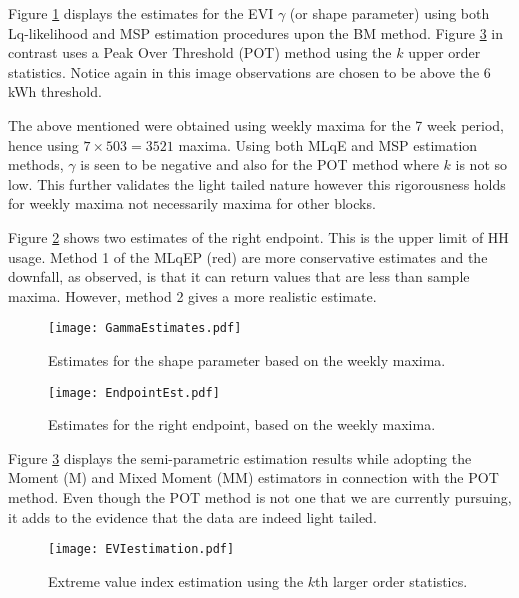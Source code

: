 Figure \ref{fig:gammaEst} displays the estimates for the EVI $\gamma$ (or shape parameter) using both Lq-likelihood and MSP estimation procedures upon the BM method. Figure \ref{fig:POTEst} in contrast uses a Peak Over Threshold (POT) method using the $k$ upper order statistics. Notice again in this image observations are chosen to be above the 6 kWh threshold.

The above mentioned were obtained using weekly maxima for the 7 week period, hence using $7 \times 503= 3521$ maxima. Using both MLqE and MSP estimation methods, $\gamma$ is seen to be negative and also for the POT method where $k$ is not so low. This further validates the light tailed nature however this rigorousness holds for weekly maxima not necessarily maxima for other blocks. 

Figure \ref{fig:EndPointEst}  shows two estimates of the right endpoint. This is the upper limit of HH usage. Method 1 of the MLqEP (red) are more conservative estimates and the downfall, as observed, is that it can return values that are less than sample maxima. However, method 2 gives a more realistic estimate.

\begin{figure}
\begin{center}
\texttt{[image: GammaEstimates.pdf]}
\caption{Estimates for the shape parameter based on the weekly maxima.} \label{fig:gammaEst}
\end{center}
\end{figure}

\begin{figure}
\begin{center}
\texttt{[image: EndpointEst.pdf]}
\caption{Estimates for the right endpoint, based on the weekly maxima.} \label{fig:EndPointEst}
\end{center}
\end{figure}

Figure \ref{fig:POTEst} displays the semi-parametric estimation results while adopting the Moment (M) and Mixed Moment (MM) estimators in connection with the POT method. Even though the POT method is not one that we are currently pursuing, it adds to the evidence that the data are indeed light tailed.

\begin{figure}
\begin{center}
\texttt{[image: EVIestimation.pdf]}
\caption{Extreme value index estimation using the $k$th larger order statistics.} \label{fig:POTEst}
\end{center}
\end{figure}

